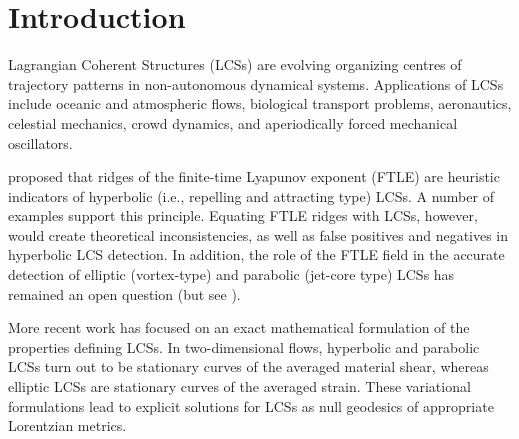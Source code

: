 \documentclass[5p]{elsarticle}
\begin{document}
\section{Introduction}

\begin{sloppypar}
Lagrangian Coherent Structures (LCSs) are evolving organizing centres of trajectory patterns in non-autonomous dynamical systems\citep{haller00:_lagran,peacock13:_lagran,haller15:_langr_coher_struc}. Applications of LCSs include oceanic and atmospheric flows\citep{beron-vera13:_objec_agulh,koh02:_hyper}, biological transport problems\citep{wilson09:_lagran_reynol,tallapragada11:_lagran,huhn12:_south_indian_ocean_count_madag}, aeronautics\citep{tang10:_accur_lagran_hong_kong_inter_airpor}, celestial mechanics\citep{gawlik09:_lagran}, crowd dynamics\citep{ali07:_lagran_partic_dynam_approac_crowd}, and aperiodically forced mechanical oscillators\citep{hadjighasem13:_detec_kam}.
\end{sloppypar}

\citet{haller01:_distin} proposed that ridges of the finite-time Lyapunov exponent (FTLE) are heuristic indicators of hyperbolic (i.e., repelling and attracting type) LCSs.
A number of examples support this principle\citep{peacock13:_lagran}.
Equating FTLE ridges with LCSs, however, would create theoretical inconsistencies, as well as false positives and negatives in hyperbolic LCS detection\citep{haller11:_lagran_coher_struc,norgard12:_secon_lagran_coher_struc}.
In addition, the role of the FTLE field in the accurate detection of elliptic (vortex-type) and parabolic (jet-core type) LCSs has remained an open question (but see \citet{beron-vera10:_invar_lagran}).

More recent work has focused on an exact mathematical formulation of the properties defining LCSs\citep{haller11:_lagran_coher_struc,farazmand12:_comput_lagran,haller12:_geodes_theor_trans_barrier_two_dimen_flows,haller13:_coher_lagran,haller14:_adden_coher_lagran,farazmand13:_attrac_lagran,blazevski14:_hyper_ellip_trans_barrier_three}.
In two-dimensional flows, hyperbolic and parabolic LCSs turn out to be stationary curves of the averaged material shear\citep{farazmand14:_shearless}, whereas elliptic LCSs are stationary curves of the averaged strain\citep{haller13:_coher_lagran,haller14:_adden_coher_lagran}.
These variational formulations lead to explicit solutions for LCSs as null geodesics of appropriate Lorentzian metrics.
\end{document}
